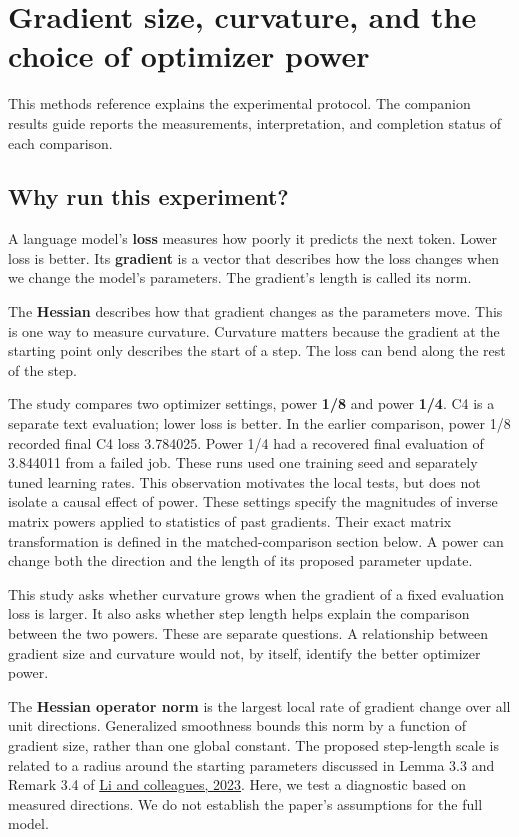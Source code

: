 \documentclass[
  14pt,
  letterpaper,
]{extarticle}
\author{}
\date{}
\begin{document}
\section{Gradient size, curvature, and the choice of optimizer
power}\label{gradient-size-curvature-and-the-choice-of-optimizer-power}

This methods reference explains the experimental protocol. The companion
results guide reports the measurements, interpretation, and completion
status of each comparison.

\subsection{Why run this experiment?}\label{why-run-this-experiment}

A language model's \textbf{loss} measures how poorly it predicts the
next token. Lower loss is better. Its \textbf{gradient} is a vector that
describes how the loss changes when we change the model's parameters.
The gradient's length is called its norm.

The \textbf{Hessian} describes how that gradient changes as the
parameters move. This is one way to measure curvature. Curvature matters
because the gradient at the starting point only describes the start of a
step. The loss can bend along the rest of the step.

The study compares two optimizer settings, power \textbf{1/8} and power
\textbf{1/4}. C4 is a separate text evaluation; lower loss is better. In
the earlier comparison, power 1/8 recorded final C4 loss 3.784025. Power
1/4 had a recovered final evaluation of 3.844011 from a failed job.
These runs used one training seed and separately tuned learning rates.
This observation motivates the local tests, but does not isolate a
causal effect of power. These settings specify the magnitudes of inverse
matrix powers applied to statistics of past gradients. Their exact
matrix transformation is defined in the matched-comparison section
below. A power can change both the direction and the length of its
proposed parameter update.

This study asks whether curvature grows when the gradient of a fixed
evaluation loss is larger. It also asks whether step length helps
explain the comparison between the two powers. These are separate
questions. A relationship between gradient size and curvature would not,
by itself, identify the better optimizer power.

The \textbf{Hessian operator norm} is the largest local rate of gradient
change over all unit directions. Generalized smoothness bounds this norm
by a function of gradient size, rather than one global constant. The
proposed step-length scale is related to a radius around the starting
parameters discussed in Lemma 3.3 and Remark 3.4 of
\href{https://proceedings.neurips.cc/paper_files/paper/2023/file/7e8bb8d17bb1cb24dfe972a2f8ff2500-Paper-Conference.pdf}{Li
and colleagues, 2023}. Here, we test a diagnostic based on measured
directions. We do not establish the paper's assumptions for the full
model.
\end{document}
